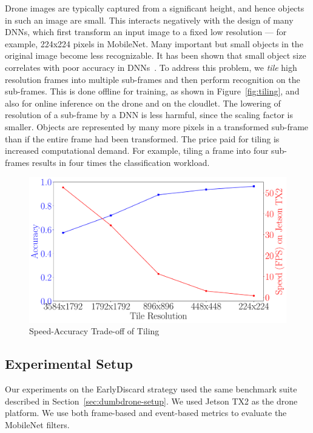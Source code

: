 Drone images are typically captured from a significant height, and hence objects
in such an image are small.  This interacts negatively with the design of many
DNNs, which first transform an input image to a fixed low resolution --- for
example, 224x224 pixels in MobileNet. Many important but small objects in the
original image become less recognizable.  It has been shown that small object
size correlates with poor accuracy in DNNs~\cite{Huang2017}.  To address this
problem, we {\em tile} high resolution frames into multiple sub-frames and then
perform recognition on the sub-frames.  This is done offline for training, as
shown in Figure~\ref{fig:tiling}, and also for online inference on the drone and
on the cloudlet.  The lowering of resolution of a sub-frame by a DNN is less
harmful, since the scaling factor is smaller.  Objects are represented by many
more pixels in a transformed sub-frame than if the entire frame had been
transformed.  The price paid for tiling is increased computational demand.  For
example, tiling a frame into four sub-frames results in four times the
classification workload.

\begin{figure}
\centering
\includegraphics[width=.8\linewidth]{FIGS/fig-tile-resolution-speed-accuracy.pdf}
\caption{Speed-Accuracy Trade-off of Tiling}
\label{fig:earlydiscard-tile-accuracy-speed}
\end{figure}


\subsection{Experimental Setup}

Our experiments on the {\xc EarlyDiscard}
strategy used the same benchmark suite described in
Section~\ref{sec:dumbdrone-setup}. We used Jetson TX2 as the drone platform. We use
both frame-based and event-based metrics to evaluate the MobileNet filters.

